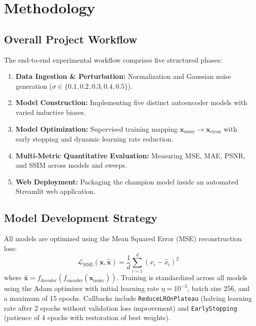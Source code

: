 \documentclass[12pt, a4paper]{article}
\begin{document}
\section{Methodology}

\subsection{Overall Project Workflow}
The end-to-end experimental workflow comprises five structured phases:
\begin{enumerate}[noitemsep]
    \item \textbf{Data Ingestion \& Perturbation:} Normalization and Gaussian noise generation ($\sigma \in \{0.1, 0.2, 0.3, 0.4, 0.5\}$).
    \item \textbf{Model Construction:} Implementing five distinct autoencoder models with varied inductive biases.
    \item \textbf{Model Optimization:} Supervised training mapping $\mathbf{x}_{\text{noisy}} \to \mathbf{x}_{\text{clean}}$ with early stopping and dynamic learning rate reduction.
    \item \textbf{Multi-Metric Quantitative Evaluation:} Measuring MSE, MAE, PSNR, and SSIM across models and sweeps.
    \item \textbf{Web Deployment:} Packaging the champion model inside an automated Streamlit web application.
\end{enumerate}

\subsection{Model Development Strategy}
All models are optimized using the Mean Squared Error (MSE) reconstruction loss:
\begin{equation}
    \mathcal{L}_{\text{MSE}}(\mathbf{x}, \hat{\mathbf{x}}) = \frac{1}{d} \sum_{i=1}^{d} (x_i - \hat{x}_i)^2
\end{equation}
where $\hat{\mathbf{x}} = f_{\text{decoder}}(f_{\text{encoder}}(\mathbf{x}_{\text{noisy}}))$. Training is standardized across all models using the Adam optimizer with initial learning rate $\eta = 10^{-3}$, batch size 256, and a maximum of 15 epochs. Callbacks include \texttt{ReduceLROnPlateau} (halving learning rate after 2 epochs without validation loss improvement) and \texttt{EarlyStopping} (patience of 4 epochs with restoration of best weights).
\end{document}
